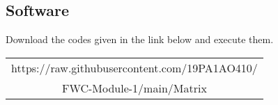 \documentclass[journal,10pt,twocolumn]{article}
\begin{document}
\begin{flushleft}
\section{Software}
\end{flushleft}
Download the codes given in the link below and execute them.\\
\begin{table}[H]
\centering
\begin{tabular}{|c|} \hline
\rule{0pt}{10pt} 
https://raw.githubusercontent.com/19PA1AO410/\\
FWC-Module-1/main/Matrix%
\\\hline
 \end{tabular}
\end{table}

\end{document}

